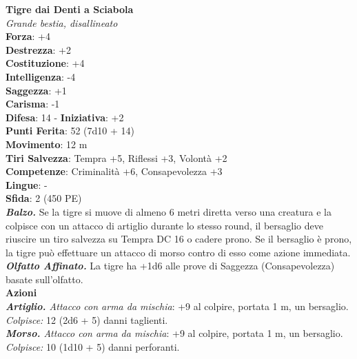 \begin{multicols}{2}
\medskip\textbf{Tigre dai Denti a Sciabola}\\
\emph{Grande bestia, disallineato}\\
\textbf{Forza}: +4\\
\textbf{Destrezza}: +2\\
\textbf{Costituzione}: +4\\
\textbf{Intelligenza}: -4\\
\textbf{Saggezza}: +1\\
\textbf{Carisma}: -1\\
\textbf{Difesa}: 14 - \textbf{Iniziativa}: +2\\
\textbf{Punti Ferita}: 52 (7d10 + 14)\\
\textbf{Movimento}: 12 m\\
\textbf{Tiri Salvezza}: Tempra +5, Riflessi +3, Volontà +2\\
\textbf{Competenze}: Criminalità +6, Consapevolezza +3\\
\textbf{Lingue}: -\\
\textbf{Sfida}: 2 (450 PE)\smallskip\\
\emph{\textbf{Balzo.}} Se la tigre si muove di almeno 6 metri diretta verso una creatura e la colpisce con un attacco di artiglio durante lo stesso round, il bersaglio deve riuscire un tiro salvezza su Tempra DC  16 o cadere prono. Se il bersaglio è prono, la tigre può effettuare un attacco di morso contro di esso come azione immediata.\\
\emph{\textbf{Olfatto Affinato.}} La tigre ha +1d6 alle prove di Saggezza (Consapevolezza) basate sull'olfatto.\\
\smallskip\textbf{Azioni}\\
\emph{\textbf{Artiglio.} Attacco con arma da mischia}: +9 al colpire, portata 1 m, un bersaglio.\\
\emph{Colpisce:} 12 (2d6 + 5) danni taglienti.\\
\emph{\textbf{Morso.} Attacco con arma da mischia}: +9 al colpire, portata 1 m, un bersaglio.\\
\emph{Colpisce:} 10 (1d10 + 5) danni perforanti.\\


\end{multicols}

